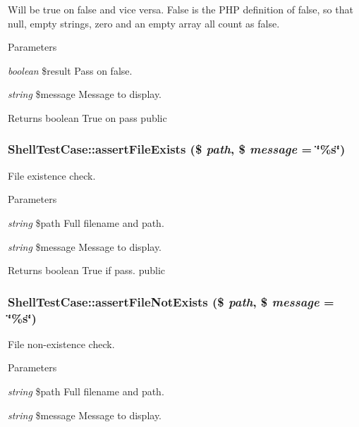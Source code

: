 \label{class_shell_test_case_a5457ff8ac3d1832fc34f8cae2e82fb5d}
Will be true on false and vice versa. False is the PHP definition of false, so that null, empty strings, zero and an empty array all count as false. 
\begin{DoxyParams}{Parameters}
\item[{\em boolean}]\$result Pass on false. \item[{\em string}]\$message Message to display. \end{DoxyParams}
\begin{DoxyReturn}{Returns}
boolean True on pass  public 
\end{DoxyReturn}
\hypertarget{class_shell_test_case_a3ca9dde84e4ce935debf085d58e72aa7}{
\subsubsection[{assertFileExists}]{\setlength{\rightskip}{0pt plus 5cm}ShellTestCase::assertFileExists (\$ {\em path}, \/  \$ {\em message} = {\ttfamily \char`\"{}\%s\char`\"{}})}}
\label{class_shell_test_case_a3ca9dde84e4ce935debf085d58e72aa7}
File existence check. 
\begin{DoxyParams}{Parameters}
\item[{\em string}]\$path Full filename and path. \item[{\em string}]\$message Message to display. \end{DoxyParams}
\begin{DoxyReturn}{Returns}
boolean True if pass.  public 
\end{DoxyReturn}
\hypertarget{class_shell_test_case_a7b9157f6e650db44eb308f860bf99228}{
\subsubsection[{assertFileNotExists}]{\setlength{\rightskip}{0pt plus 5cm}ShellTestCase::assertFileNotExists (\$ {\em path}, \/  \$ {\em message} = {\ttfamily \char`\"{}\%s\char`\"{}})}}
\label{class_shell_test_case_a7b9157f6e650db44eb308f860bf99228}
File non-\/existence check. 
\begin{DoxyParams}{Parameters}
\item[{\em string}]\$path Full filename and path. \item[{\em string}]\$message Message to display. \end{DoxyParams}
